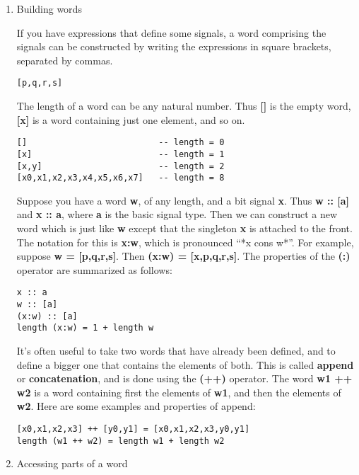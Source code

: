 \documentclass[11pt]{article}
\begin{document}
\begin{enumerate}
\item Building words
\label{sec:org0c5530d}

If you have expressions that define some signals, a word comprising
the signals can be constructed by writing the expressions in square
brackets, separated by commas.


\begin{verbatim}
[p,q,r,s]
\end{verbatim}



The length of a word can be any natural number.  Thus \textbf{[]} is the
empty word, \textbf{[x]} is a word containing just one element, and so on.


\begin{verbatim}
[]                          -- length = 0
[x]                         -- length = 1
[x,y]                       -- length = 2
[x0,x1,x2,x3,x4,x5,x6,x7]   -- length = 8
\end{verbatim}


Suppose you have a word \textbf{w}, of any length, and a bit signal \textbf{x}.
Thus \textbf{w :: [a]} and \textbf{x :: a}, where \textbf{a} is the basic signal type.
Then we can construct a new word which is just like \textbf{w} except that
the singleton \textbf{x} is attached to the front.  The notation for this is
\textbf{x:w}, which is pronounced ``*x cons w*''.  For example, suppose \textbf{w =
[p,q,r,s]}.  Then \textbf{(x:w) = [x,p,q,r,s]}.  The properties of the \textbf{(:)}
operator are summarized as follows:


\begin{verbatim}
x :: a
w :: [a]
(x:w) :: [a]
length (x:w) = 1 + length w
\end{verbatim}


It's often useful to take two words that have already been defined,
and to define a bigger one that contains the elements of both.  This
is called \textbf{append} or \textbf{concatenation}, and is done using the
\textbf{(++)} operator.  The word \textbf{w1 ++ w2} is a word containing first the
elements of \textbf{w1}, and then the elements of \textbf{w2}.  Here are some
examples and properties of append:


\begin{verbatim}
[x0,x1,x2,x3] ++ [y0,y1] = [x0,x1,x2,x3,y0,y1]
length (w1 ++ w2) = length w1 + length w2
\end{verbatim}

\item Accessing parts of a word
\label{sec:org9571b80}


\end{enumerate}
\end{document}
